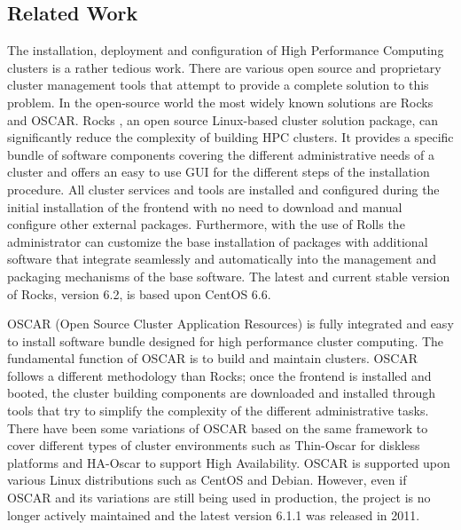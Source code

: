 \subsection{Related Work} \label{sec:related_work}

The installation, deployment and configuration of High Performance Computing clusters is a rather tedious work. 
There are various open source and proprietary cluster management tools that attempt to provide a complete solution to this problem.
In the open-source world the most widely known solutions are Rocks and OSCAR.
Rocks \cite{rocks2003,rocks_url}, an open source Linux-based cluster solution package, can significantly reduce the complexity of building HPC clusters.
It provides a specific bundle of software components covering the different administrative needs of a cluster and offers an easy to use GUI
for the different steps of the installation procedure.
All cluster services and tools are installed and configured during the initial installation of the frontend with no need to download and
manual configure other external packages. Furthermore, with the use of Rolls \cite{rolls2004} the administrator can customize the base installation of packages with
additional software that integrate seamlessly and automatically into the management and packaging mechanisms of the base software.
The latest and current stable version of Rocks, version 6.2, is based upon CentOS 6.6.

OSCAR \cite{oscar2001,oscar_url} (Open Source Cluster Application Resources) is fully integrated and easy to install software bundle designed for
high performance cluster computing. The fundamental function of OSCAR is to build and maintain clusters. 
OSCAR follows a different methodology than Rocks; once the frontend is installed and booted, the cluster building components are downloaded and installed
through tools that try to simplify the complexity of the different administrative tasks. 
There have been some variations of OSCAR based on the same framework to cover different types of cluster environments such as Thin-Oscar for diskless platforms
and HA-Oscar to support High Availability. OSCAR is supported upon various Linux distributions such as CentOS and Debian. However, even if OSCAR and its 
variations are still being used in production, the project is no longer actively maintained and the latest version 6.1.1 was released in 2011. 

